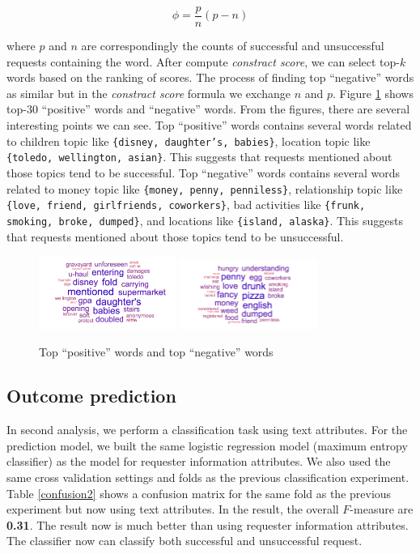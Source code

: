 \begin{equation}
	\phi = \frac{p}{n}(p-n)
\end{equation}    

where $p$ and $n$ are correspondingly the counts of successful and unsuccessful requests containing the word. After compute \textit{constract score}, we can select top-$k$ words based on the ranking of scores. The process of finding top ``negative'' words as similar but in the \textit{constract score} formula we exchange $n$ and $p$. Figure \ref{top} shows top-30 ``positive'' words and ``negative'' words. From the figures, there are several interesting points we can see. Top ``positive'' words contains several words related to children topic like \texttt{\{disney, daughter's, babies\}}, location topic like \texttt{\{toledo, wellington, asian\}}. This suggests that requests mentioned about those topics tend to be successful. Top ``negative'' words contains several words related to money topic like \texttt{\{money, penny, penniless\}}, relationship topic like \texttt{\{love, friend, girlfriends, coworkers\}}, bad activities like \texttt{\{frunk, smoking, broke, dumped\}}, and locations like \texttt{\{island, alaska\}}. This suggests that requests mentioned about those topics tend to be unsuccessful.

\begin{figure}
	\centering
	\includegraphics[width=0.40\textwidth]{data/positive}
	\includegraphics[width=0.40\textwidth]{data/negative}
	\caption{Top ``positive'' words and top ``negative'' words}
	\label{top}
\end{figure}

\subsection{Outcome prediction}
In second analysis, we perform a classification task using text attributes. For the prediction model, we built the same logistic regression model (maximum entropy classifier) as the model for requester information attributes. We also used the same cross validation settings and folds as the previous classification experiment. Table \ref{confusion2} shows a confusion matrix for the same fold as the previous experiment but now using text attributes. In the result, the overall $F$-measure are \textbf{0.31}. The result now is much better than using requester information attributes. The classifier now can classify both successful and unsuccessful request.

